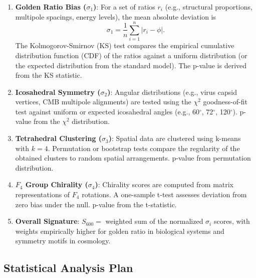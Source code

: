 \documentclass[11pt,a4paper]{article}
\begin{document}
\begin{enumerate}
    \item \textbf{Golden Ratio Bias ($\sigma_1$)}: For a set of ratios $r_i$ (e.g., structural proportions, multipole spacings, energy levels), the mean absolute deviation is
    \begin{equation}
    \sigma_1 = \frac{1}{n} \sum_{i=1}^{n} \left| r_i - \phi \right|.
    \end{equation}
    The Kolmogorov-Smirnov (KS) test compares the empirical cumulative distribution function (CDF) of the ratios against a uniform distribution (or the expected distribution from the standard model). The p-value is derived from the KS statistic.

    \item \textbf{Icosahedral Symmetry ($\sigma_2$)}: Angular distributions (e.g., virus capsid vertices, CMB multipole alignments) are tested using the $\chi^2$ goodness-of-fit test against uniform or expected icosahedral angles (e.g., 60$^\circ$, 72$^\circ$, 120$^\circ$). p-value from the $\chi^2$ distribution.

    \item \textbf{Tetrahedral Clustering ($\sigma_3$)}: Spatial data are clustered using k-means with $k=4$. Permutation or bootstrap tests compare the regularity of the obtained clusters to random spatial arrangements. p-value from permutation distribution.

    \item \textbf{$F_4$ Group Chirality ($\sigma_4$)}: Chirality scores are computed from matrix representations of $F_4$ rotations. A one-sample t-test assesses deviation from zero bias under the null. p-value from the t-statistic.

    \item \textbf{Overall Signature}: $S_{600} =$ weighted sum of the normalized $\sigma_i$ scores, with weights empirically higher for golden ratio in biological systems and symmetry motifs in cosmology.
\end{enumerate}

\subsection{Statistical Analysis Plan}
\end{document}
